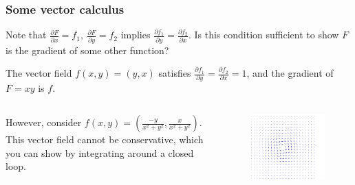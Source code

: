 \documentclass[xcolor=dvipsnames]{beamer}
\begin{document}
    \begin{frame}
    \frametitle{Some vector calculus} 
    Note that $\frac{\partial F}{\partial x}=f_1,\ \frac{\partial F}{\partial y}=f_2$ implies $\frac{\partial f_1}{\partial y}=\frac{\partial f_2}{\partial x}$. Is this condition sufficient to show $F$ is the gradient of some other function?
    \begin{example}
        The vector field $f(x,y)=(y,x)$ satisfies $\frac{\partial f_1}{\partial y}= \frac{\partial f_2}{\partial x}=1$, and the gradient of $F=xy$ is $f$.
    \end{example}%
    \begin{example}
        \begin{columns}
            However, consider $f(x,y)=\left( \frac{-y}{x^2+y^2},\frac{x}{x^2+y^2} \right) $. This vector field cannot be conservative, which you can show by integrating around a closed loop.
            \begin{figure}[H]
            \centering
             \includegraphics[width=1\linewidth]{derham1.png}
            \end{figure}
        \end{columns} 
    \end{example}
    \end{frame}
\end{document}
